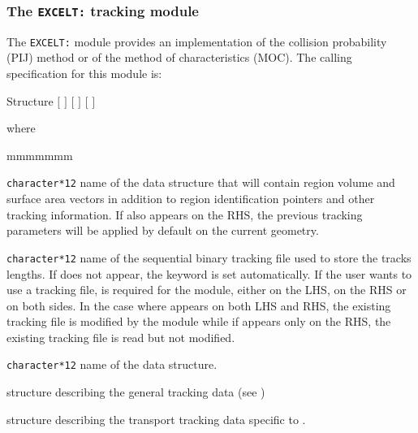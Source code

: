 \subsubsection{The {\tt EXCELT:} tracking module}\label{sect:EXCELLData}

The {\tt EXCELT:} module provides an implementation of the collision probability (PIJ) method or of the method of characteristics (MOC).
The calling specification for this module is:

\begin{DataStructure}{Structure }
 $[$  $]$
\moc{:=}  $[$  $]$ $[$  $]$ 
 \moc{::}   
\end{DataStructure}

\noindent  where
\begin{ListeDeDescription}{mmmmmmm}

\item[\dusa{TRKNAM}] {\tt character*12} name of the  data
structure that will contain region volume and surface area vectors in
addition to region identification pointers and other tracking information.
If  also appears on the RHS, the previous tracking 
parameters will be applied by default on the current geometry.

\item[\dusa{TRKFIL}] {\tt character*12} name of the sequential binary tracking
file  used to store the tracks lengths. If  does not appear, the keyword
 is set automatically. If the user wants to use a tracking file,
 is required for the  module, either on the LHS, on the RHS or on both sides. In
the case where  appears on both LHS and RHS, the existing tracking
file is modified by the module while if  appears only on the RHS,
the existing tracking file is read but not modified.

\item[\dusa{GEONAM}] {\tt character*12} name of the  data
structure.

\item[\dstr{desctrack}] structure describing the general tracking data (see
)

\item[\dstr{descexcel}] structure describing the transport tracking data
specific to .

\end{ListeDeDescription}

